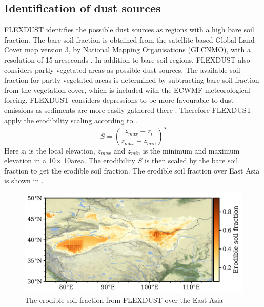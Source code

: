 \subsection{Identification of dust sources}
FLEXDUST identifies the possible dust sources as regions with a high bare soil fraction. 
The bare soil fraction is obtained from the satellite-based Global Land Cover map version 3, by National Mapping Organisations (GLCNMO), with a 
resolution of 15 arcseconds \parencite{shirahata2017production}.
In addition to bare soil regions, FLEXDUST also considers partly vegetated areas as possible
dust sources. The available soil fraction for partly vegetated areas is determined by
subtracting bare soil fraction from the vegetation cover, which is included with the ECWMF meteorological forcing.
FLEXDUST considers depressions to be more favourable to dust emissions as sediments are more easily gathered there \parencite{zender2003mineral}. Therefore FLEXDUST apply the erodibility scaling 
 according to \textcite{dust_dist_Ginoux2001}. 
\begin{equation}\label{eq_ero_soil_frac}
    S = \left(\frac{z_{max} - z_i}{z_{max} - z_{min}}\right)^5 
\end{equation}    
Here $z_i$ is the local elevation, $z_{max}$ and $z_{min}$ is the minimum and
maximum elevation in a 10\degree $\times$ 10\degree area.  The erodibility $S$ is
then scaled by the bare soil fraction to get the erodible soil fraction. The erodible soil fraction over East Asia is shown in . 
\begin{figure}[hptb]
    \centering
    \includegraphics[width=\textwidth]{../figs/erodible_soil_fraction.pdf}
    \caption{The erodible soil fraction from FLEXDUST over the East Asia}
    \label{fig:erodible_soil_fraction_EA}
\end{figure}
